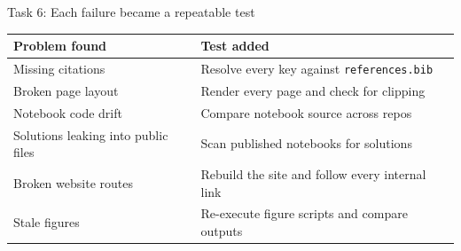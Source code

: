\begin{frame}{Task 6: Each failure became a repeatable test}
  \vfill
  \begin{center}\small
  \renewcommand{\arraystretch}{1.15}
  \begin{tabular}{@{}>{\raggedright\arraybackslash}p{4.6cm}>{\raggedright\arraybackslash}p{7.1cm}@{}}
    \toprule
    \textbf{Problem found} & \textbf{Test added} \\
    \midrule
    Missing citations & Resolve every key against \texttt{references.bib} \\
    Broken page layout & Render every page and check for clipping \\
    Notebook code drift & Compare notebook source across repos \\
    Solutions leaking into public files & Scan published notebooks for solutions \\
    Broken website routes & Rebuild the site and follow every internal link \\
    Stale figures & Re-execute figure scripts and compare outputs \\
    \bottomrule
  \end{tabular}
  \end{center}
  \vspace{0.6em}
  \begin{center}
  \end{center}
  \vspace{0.45cm plus 1fill}
\end{frame}


